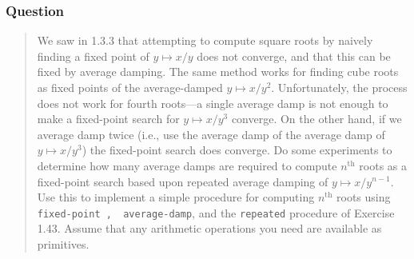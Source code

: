\documentclass[final,fleqn,titlepage,twoside]{article}
\begin{document}
\subsubsection{Question}
\label{sec:org62de9cb}
\begin{quote}
We saw in 1.3.3 that attempting to compute square roots by naively finding a
fixed point of \(y \mapsto x / y\) does not converge, and that this can be fixed
by average damping. The same method works for finding cube roots as fixed points
of the average-damped \(y \mapsto x / y^2\). Unfortunately, the process does not
work for fourth roots---a single average damp is not enough to make a
fixed-point search for \(y \mapsto x / y^3\) converge. On the other hand, if we
average damp twice (i.e., use the average damp of the average damp of \(y
\mapsto x / y^3\)) the fixed-point search does converge. Do some experiments to
determine how many average damps are required to compute \(n^{\mathrm{th}}\)
roots as a fixed-point search based upon repeated average damping of \(y \mapsto
x / y^{n-1}\). Use this to implement a simple procedure for computing
\(n^{\mathrm{th}}\) roots using \texttt{fixed-point~, ~average-damp}, and the
\texttt{repeated} procedure of Exercise 1.43. Assume that any arithmetic
operations you need are available as primitives.
\end{quote}
\end{document}
